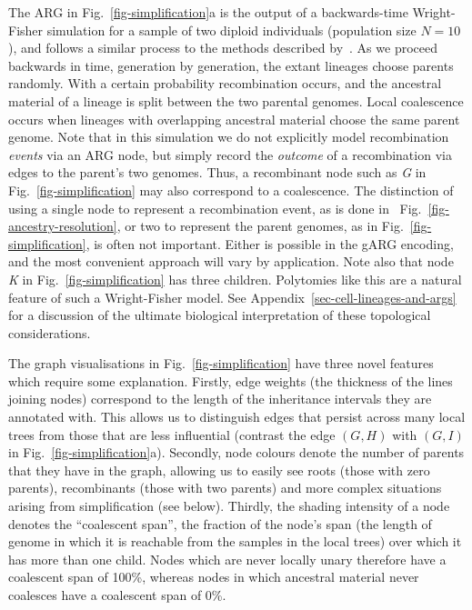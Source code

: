 \documentclass[9pt,twocolumn,twoside]{gsajnl}
\newcommand{\noderef}[1]{\textit{#1}}
\begin{document}
The ARG in Fig.~\ref{fig-simplification}a is the output of a
backwards-time Wright-Fisher simulation for a sample of two diploid
individuals (population size $N=10$), and follows a similar process
to the methods described by~\cite{nelson2020accounting}.
As we proceed backwards in time, generation by generation, the
extant lineages choose parents randomly.
With a certain probability recombination occurs, and the ancestral
material of a lineage is split between the two parental
genomes. Local coalescence occurs
when lineages with overlapping ancestral material choose the same
parent genome.
Note that in this simulation we do not explicitly
model recombination \emph{events} via an ARG node, but simply record
the \emph{outcome} of a recombination via edges to
the parent's two genomes.
Thus, a recombinant node such as \noderef{G} in Fig.~\ref{fig-simplification}
may also correspond to a coalescence.
The distinction of
using a single node to represent
a recombination event, as is done in ~Fig.~\ref{fig-ancestry-resolution},
or two to represent the parent genomes, as in Fig.~\ref{fig-simplification},  
is often not important.
Either is possible in the gARG encoding, and 
the most convenient approach will vary by application.
Note also that node \noderef{K} in Fig.~\ref{fig-simplification} has three children.
Polytomies like this are a natural feature of such a Wright-Fisher model.
See Appendix~\ref{sec-cell-lineages-and-args} for a discussion of the 
ultimate biological interpretation of these topological considerations.

The graph visualisations in Fig.~\ref{fig-simplification} have
three novel features which require some explanation.
Firstly, edge weights (the thickness of the lines joining
nodes) correspond to the length of the inheritance intervals
they are annotated with. This allows us to distinguish
edges that persist across many local trees from those that are
less influential (contrast the edge
$(\noderef{G}, \noderef{H})$
with $(\noderef{G}, \noderef{I})$
in Fig.~\ref{fig-simplification}a).
Secondly, node colours denote the number of parents that they
have in the graph, allowing us to easily see roots (those
with zero parents), recombinants (those with two parents)
and more complex situations arising from simplification (see below).
Thirdly, the shading intensity of a node denotes the ``coalescent span'', the
fraction of the node's span (the length of genome in which it
is reachable from the samples in the local trees)
over which it has more than one child. Nodes which
are never locally unary therefore have a coalescent span of 100\%,
whereas nodes in which ancestral material never coalesces have a
coalescent span of 0\%.
\end{document}
